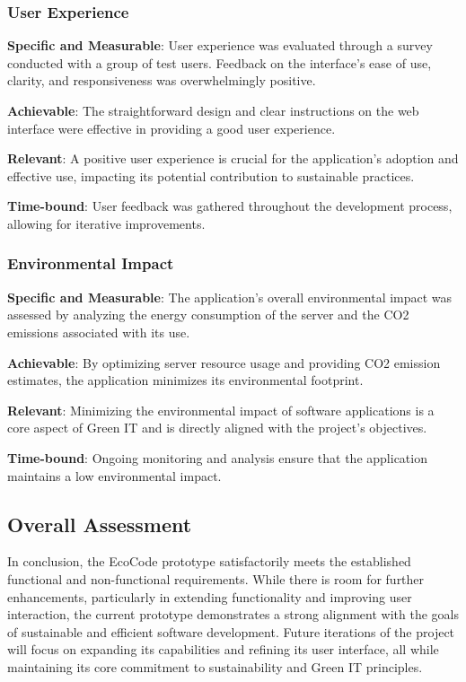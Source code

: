 \documentclass[conference,compsoc]{IEEEtran}
\begin{document}
\subsubsection{User Experience}
\textbf{Specific and Measurable}: User experience was evaluated through a survey conducted with a group of test users. Feedback on the interface's ease of use, clarity, and responsiveness was overwhelmingly positive.

\textbf{Achievable}: The straightforward design and clear instructions on the web interface were effective in providing a good user experience.

\textbf{Relevant}: A positive user experience is crucial for the application's adoption and effective use, impacting its potential contribution to sustainable practices.

\textbf{Time-bound}: User feedback was gathered throughout the development process, allowing for iterative improvements.

\subsubsection{Environmental Impact}
\textbf{Specific and Measurable}: The application's overall environmental impact was assessed by analyzing the energy consumption of the server and the CO2 emissions associated with its use.

\textbf{Achievable}: By optimizing server resource usage and providing CO2 emission estimates, the application minimizes its environmental footprint.

\textbf{Relevant}: Minimizing the environmental impact of software applications is a core aspect of Green IT and is directly aligned with the project's objectives.

\textbf{Time-bound}: Ongoing monitoring and analysis ensure that the application maintains a low environmental impact.

\subsection{Overall Assessment}
In conclusion, the EcoCode prototype satisfactorily meets the established functional and non-functional requirements. While there is room for further enhancements, particularly in extending functionality and improving user interaction, the current prototype demonstrates a strong alignment with the goals of sustainable and efficient software development. Future iterations of the project will focus on expanding its capabilities and refining its user interface, all while maintaining its core commitment to sustainability and Green IT principles.
\end{document}

